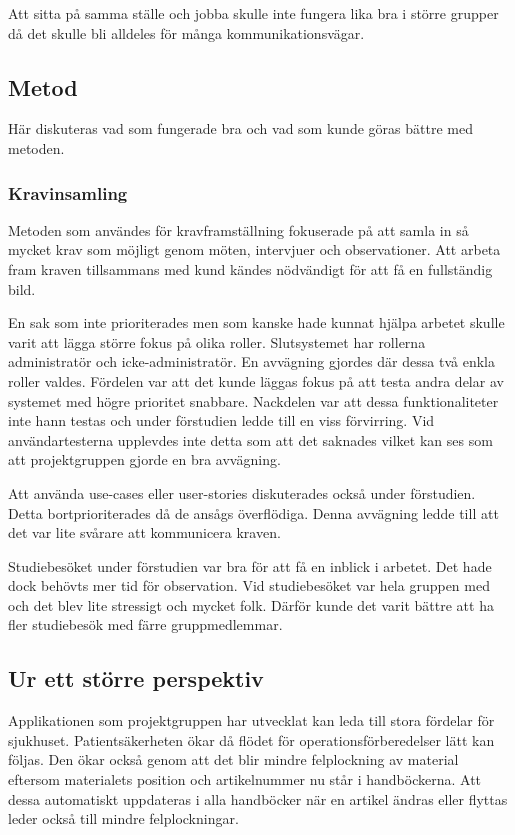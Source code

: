 \documentclass{article}
\begin{document}
Att sitta på samma ställe och jobba skulle inte fungera lika bra i större grupper då det skulle bli alldeles för många kommunikationsvägar. 

\subsection{Metod}
Här diskuteras vad som fungerade bra och vad som kunde göras bättre med metoden.
\subsubsection{Kravinsamling}
Metoden som användes för kravframställning fokuserade på att samla in så mycket krav som möjligt genom möten, intervjuer och observationer. Att arbeta fram kraven tillsammans med kund kändes nödvändigt för att få en fullständig bild. 

En sak som inte prioriterades men som kanske hade kunnat hjälpa arbetet skulle varit att lägga större fokus på olika roller. Slutsystemet har rollerna administratör och icke-administratör. En avvägning gjordes där dessa två enkla roller valdes. Fördelen var att det kunde läggas fokus på att testa andra delar av systemet med högre prioritet snabbare. Nackdelen var att dessa funktionaliteter inte hann testas och under förstudien ledde till en viss förvirring. Vid användartesterna upplevdes inte detta som att det saknades vilket kan ses som att projektgruppen gjorde en bra avvägning. 

Att använda use-cases eller user-stories diskuterades också under förstudien. Detta bortprioriterades då de ansågs överflödiga. Denna avvägning ledde till att det var lite svårare att kommunicera kraven. 

Studiebesöket under förstudien var bra för att få en inblick i arbetet. Det hade dock behövts mer tid för observation. Vid studiebesöket var hela gruppen med och det blev lite stressigt och mycket folk. Därför kunde det varit bättre att ha fler studiebesök med färre gruppmedlemmar.

\subsection{Ur ett större perspektiv}
Applikationen som projektgruppen har utvecklat kan leda till stora fördelar för sjukhuset. Patientsäkerheten ökar då flödet för operationsförberedelser lätt kan följas. Den ökar också genom att det blir mindre felplockning av material eftersom materialets position och artikelnummer nu står i handböckerna. Att dessa automatiskt uppdateras i alla handböcker när en artikel ändras eller flyttas leder också till mindre felplockningar. 
\end{document}
